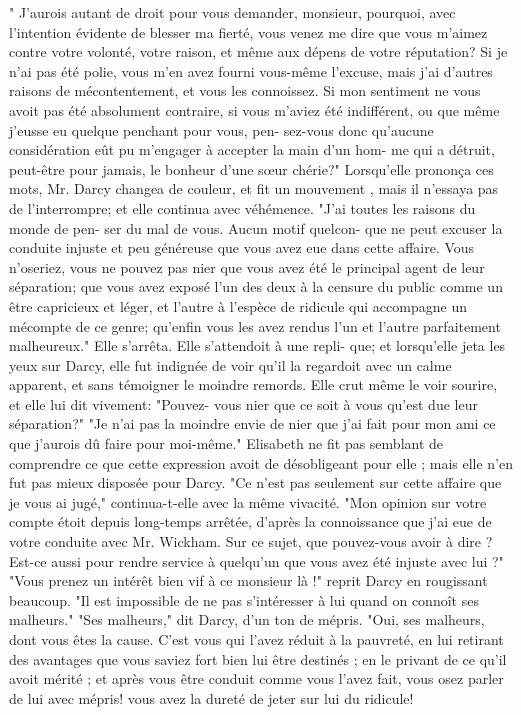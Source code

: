 " J'aurois autant de droit pour vous demander, monsieur, pourquoi, avec l'intention évidente de blesser ma fierté, vous venez me dire que vous m'aimez contre votre volonté, votre raison, et même aux dépens de votre réputation? Si je n'ai pas été polie, vous m'en avez fourni vous-même l'excuse, mais j'ai d'autres raisons de mécontentement, et vous les connoissez. Si mon sentiment ne vous avoit pas été absolument contraire, si vous m'aviez été indifférent, ou que même\setcounter{page}{550} j'eusse eu quelque penchant pour vous, pen- sez-vous donc qu'aucune considération eût pu m'engager à accepter la main d'un hom- me qui a détruit, peut-être pour jamais, le bonheur d'une sœur chérie?"
Lorsqu'elle prononça ces mots, Mr. Darcy changea de couleur, et fit un mouvement , mais il n'essaya pas de l'interrompre; et elle continua avec véhémence.
"J'ai toutes les raisons du monde de pen- ser du mal de vous. Aucun motif quelcon- que ne peut excuser la conduite injuste et peu généreuse que vous avez eue dans cette affaire. Vous n'oseriez, vous ne pouvez pas nier que vous avez été le principal agent de leur séparation; que vous avez exposé l'un des deux à la censure du public comme un être capricieux et léger, et l'autre à l'espèce de ridicule qui accompagne un mécompte de ce genre; qu'enfin vous les avez rendus l'un et l'autre parfaitement malheureux."
Elle s'arrêta. Elle s'attendoit à une repli- que; et lorsqu'elle jeta les yeux sur Darcy, elle fut indignée de voir qu'il la regardoit avec un calme apparent, et sans témoigner le moindre remords. Elle crut même le voir sourire, et elle lui dit vivement: "Pouvez- vous nier que ce soit à vous qu'est due leur séparation?"
\setcounter{page}{551}
"Je n’ai pas la moindre envie de nier que j’ai fait pour mon ami ce que j’aurois dû faire pour moi-même."
Elisabeth ne fit pas semblant de comprendre ce que cette expression avoit de désobligeant pour elle ; mais elle n’en fut pas mieux disposée pour Darcy. "Ce n’est pas seulement sur cette affaire que je vous ai jugé," continua-t-elle avec la même vivacité. "Mon opinion sur votre compte étoit depuis long-temps arrêtée, d’après la connoissance que j’ai eue de votre conduite avec Mr. Wickham. Sur ce sujet, que pouvez-vous avoir à dire ? Est-ce aussi pour rendre service à quelqu’un que vous avez été injuste avec lui ?"
"Vous prenez un intérêt bien vif à ce monsieur là !" reprit Darcy en rougissant beaucoup.
"Il est impossible de ne pas s’intéresser à lui quand on connoît ses malheurs."
"Ses malheurs," dit Darcy, d’un ton de mépris.
"Oui, ses malheurs, dont vous êtes la cause. C’est vous qui l’avez réduit à la pauvreté, en lui retirant des avantages que vous saviez fort bien lui être destinés ; en le privant de ce qu’il avoit mérité ; et après vous être conduit comme vous l’avez fait, vous\setcounter{page}{552} osez parler de lui avec mépris! vous avez la dureté de jeter sur lui du ridicule!
